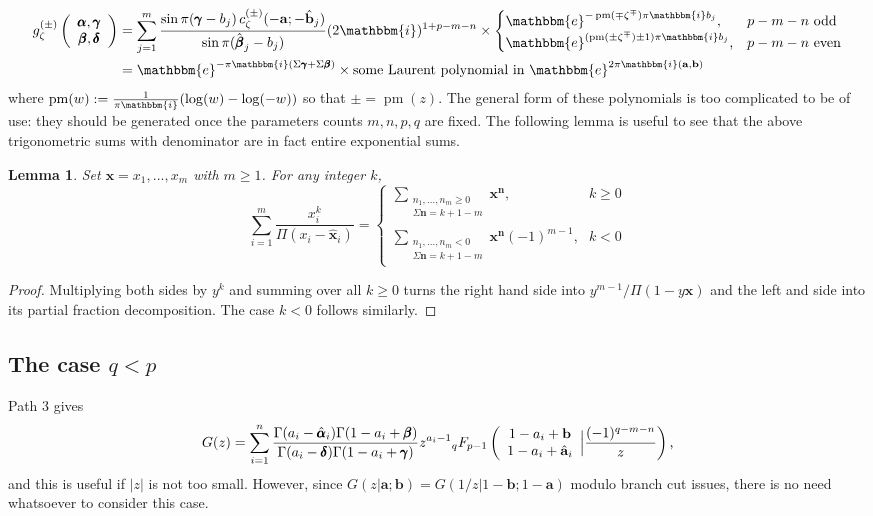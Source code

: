 \documentclass[12pt]{article}
\newcommand{\ee}[0] {\mathbbm{e}}
\newcommand{\ii}[0] {\mathbbm{i}}
\numberwithin{equation}{section}
\newtheorem{lemma}[theorem]{Lemma}
\newcommand{\FF}[6] {{}_{#1}{#2}_{#3} \left( \begin{array}{c} #4 \\ #5 \end{array} \Big| {#6}  \right)}
\newcommand{\bfa}[0] {\mathbf{a}}
\newcommand{\bfb}[0] {\mathbf{b}}
\newcommand{\bfn}[0] {\mathbf{n}}
\newcommand{\bfx}[0] {\mathbf{x}}
\begin{document}
\begin{align*}
g_{\zeta}^{(\pm)}\left(\begin{array}{c} \bfalpha, \bfgamma \\ \bfbeta, \bfdelta \end{array}\right) &= \sum_{j=1}^{m} \frac{\sin \pi (\bfgamma - b_j) \, c_{\zeta}^{(\pm)}(-\bfa; -\hat{\bfb}_j)}{\sin \pi (\hat{\bfbeta}_j-b_j)} (2 \ii)^{1+p-m-n} \times \begin{cases} \ee^{-\operatorname{pm}(\mp \zeta^{\mp})\pi \ii b_j}\text{,}& p-m-n \text{ odd}\\
\ee^{(\operatorname{pm}(\pm \zeta^{\mp}) \pm 1) \pi \ii b_j}\text{,}& p-m-n \text{ even}\end{cases}\\
&= \ee^{-\pi \ii (\Sigma \bfgamma + \Sigma \bfbeta)} \times \text{some Laurent polynomial in } \ee^{2\pi \ii (\bfa, \bfb)}
\end{align*}
where $\operatorname{pm}(w) := \frac{1}{\pi \ii}(\log(w)-\log(-w))$ so that $\pm = \operatorname{pm}(z)$. The general form of these polynomials is too complicated to be of use: they should be generated once the parameters counts $m,n,p,q$ are fixed. The following lemma is useful to see that the above trigonometric sums with denominator are in fact entire exponential sums.
\begin{lemma}
\label{lemmatrig}
Set $\bfx = x_1, ..., x_m$ with $m \ge 1$. For any integer $k$,
\begin{equation*}
\sum_{i=1}^{m} \frac{x_i^k}{\Pi(x_i-\hat{\bfx}_i)} = \begin{cases} \sum\limits_{\substack{n_1, \dots, n_m \ge 0 \\ \Sigma \bfn = k+1-m}} \bfx^\bfn \text{,} & k \ge 0\\
\sum\limits_{\substack{n_1, \dots, n_m < 0 \\ \Sigma \bfn = k+1-m}} \bfx^{\bfn} (-1)^{m-1} \text{,} & k < 0
\end{cases}
\end{equation*}
\end{lemma}
\begin{proof}
Multiplying both sides by $y^k$ and summing over all $k \ge 0$ turns the right hand side into $y^{m-1} / \Pi(1-y\bfx)$ and the left and side into its partial fraction decomposition. The case $k < 0$ follows similarly.
\end{proof}

\subsection{The case $q<p$}
Path 3 gives
\begin{equation}
\label{eq_Gpath3}
G(z) = \sum_{i=1}^{n} \frac{\Gamma(a_i-\hat{\bfalpha}_i)\Gamma(1-a_i+\bfbeta)}{\Gamma(a_i-\bfdelta)\Gamma(1-a_i+\bfgamma)} z^{a_i-1}\FF{q}{F}{p-1}{1-a_i+\bfb}{1-a_i+\hat{\bfa}_i}{\frac{(-1)^{q-m-n}}{z}}\text{,}
\end{equation}
and this is useful if $|z|$ is not too small. However, since $G(z|\bfa; \bfb) = G(1/z|1-\bfb; 1-\bfa)$ modulo branch cut issues, there is no need whatsoever to consider this case.
\end{document}
